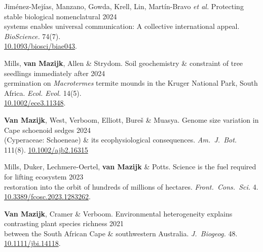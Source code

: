 Jiménez-Mejías, Manzano, Gowda, Krell, Lin, Martín-Bravo \textit{et al.}
Protecting stable biological nomenclatural                                          \hfill 2024 \\
\hspace{2em} systems enables universal communication: A collective international appeal.
  \textit{BioScience.}
  74(7). \\
  \hspace{2em} \href{https://doi.org/10.1093/biosci/biae043}{10.1093/biosci/biae043}.

Mills, \textbf{van Mazijk}, Allen \& Strydom.
Soil geochemistry \& constraint of tree seedlings immediately after
                                                              \hfill 2024 \\
\hspace{2em} germination on \textit{Macrotermes} termite
  mounds in the Kruger National Park, South Africa.
  \textit{Ecol. Evol.} 14(5). \\
  \hspace{2em} \href{http://dx.doi.org/10.1002/ece3.11348}{10.1002/ece3.11348}.

\textbf{Van Mazijk}, West, Verboom, Elliott, Bureš \& Muasya.
Genome size variation in Cape schoenoid sedges                \hfill 2024 \\
\hspace{2em} (Cyperaceae: Schoeneae) \& its ecophysiological consequences.
  \textit{Am.~J.~Bot.}
  111(8).
  \href{http://dx.doi.org/10.1002/ajb2.16315}{10.1002/ajb2.16315}

Mills, Duker, Lechmere-Oertel, \textbf{van Mazijk} \& Potts.
Science is the fuel required for lifting ecosystem             \hfill 2023 \\
\hspace{2em} restoration into the orbit of hundreds of millions of hectares.
  \textit{Front.~Cons.~Sci.}
  4. \\
  \hspace{2em} \href{https://doi.org/10.3389/fcosc.2023.1283262}{10.3389/fcosc.2023.1283262}.

\textbf{Van Mazijk}, Cramer \& Verboom.
Environmental heterogeneity explains contrasting plant species richness
                                                                  \hfill 2021 \\
\hspace{2em}
  between the South African Cape \& southwestern Australia.
  \textit{J.~Biogeog.}
  48. \href{https://doi.org/10.1111/jbi.14118}{10.1111/jbi.14118}.

